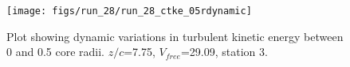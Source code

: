 \begin{figure}[H]
\centering
\texttt{[image: figs/run\_28/run\_28\_ctke\_05rdynamic]}
\caption{Plot showing dynamic variations in turbulent kinetic energy between 0 and 0.5 core radii. $z/c$=7.75, $V_{free}$=29.09, station 3.}
\label{fig:run_28_ctke_05rdynamic}
\end{figure}


